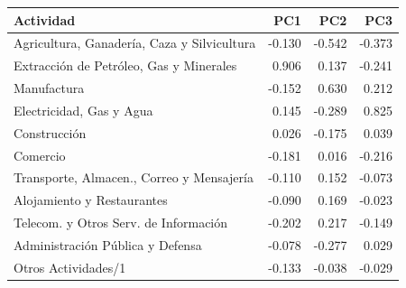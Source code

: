 \begin{tabular}{p{.58\linewidth}rrr}
\toprule
Actividad & PC1 & PC2 & PC3 \\
\midrule
Agricultura, Ganadería, Caza y Silvicultura & -0.130 & -0.542 & -0.373 \\
Extracción de Petróleo, Gas y Minerales & 0.906 & 0.137 & -0.241 \\
Manufactura & -0.152 & 0.630 & 0.212 \\
Electricidad, Gas y Agua & 0.145 & -0.289 & 0.825 \\
Construcción & 0.026 & -0.175 & 0.039 \\
Comercio & -0.181 & 0.016 & -0.216 \\
Transporte, Almacen., Correo y Mensajería & -0.110 & 0.152 & -0.073 \\
Alojamiento y Restaurantes & -0.090 & 0.169 & -0.023 \\
Telecom. y Otros Serv. de Información & -0.202 & 0.217 & -0.149 \\
Administración Pública y Defensa & -0.078 & -0.277 & 0.029 \\
Otros Actividades/1 & -0.133 & -0.038 & -0.029 \\
\bottomrule
\end{tabular}
